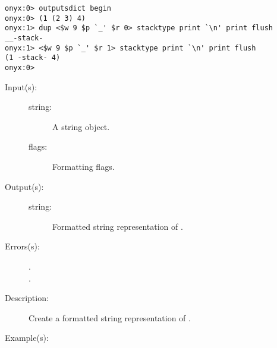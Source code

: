 \begin{description}
\begin{description}
\begin{verbatim}
onyx:0> outputsdict begin
onyx:0> (1 (2 3) 4)
onyx:1> dup <$w 9 $p `_' $r 0> stacktype print `\n' print flush
__-stack-
onyx:1> <$w 9 $p `_' $r 1> stacktype print `\n' print flush
(1 -stack- 4)
onyx:0>
		\end{verbatim}
	\end{description}
\label{outputsdict:stringtype}
\item[{\onyxop{string flags}{stringtype}{string}}: ]
	\begin{description}\item[]
	\item[Input(s): ]
		\begin{description}\item[]
		\item[string: ]
			A string object.
		\item[flags: ]
			Formatting flags.
		\end{description}
	\item[Output(s): ]
		\begin{description}\item[]
		\item[string: ]
			Formatted string representation of .
		\end{description}
	\item[Errors(s): ]
		\begin{description}\item[]
		\item[.]
		\item[.]
		\end{description}
	\item[Description: ]
		Create a formatted string representation of .
	\item[Example(s): ]\begin{verbatim}


\end{verbatim}
\end{description}
\end{description}
